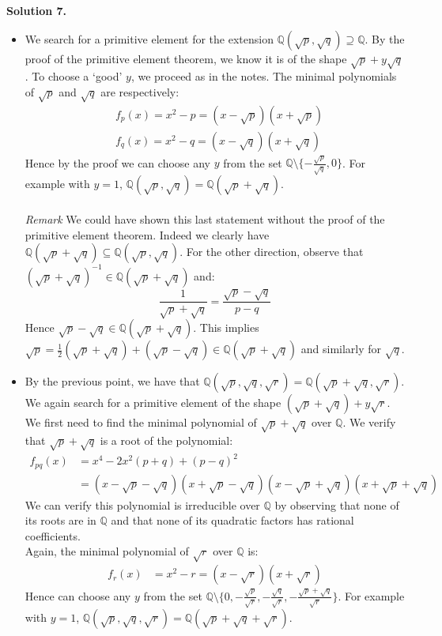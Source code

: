 \documentclass[12pt,a4paper]{article}
\begin{document}
\textbf{Solution 7.}

\begin{itemize}
\item We search for a primitive element for the extension $\mathbb{Q}(\sqrt{p},\sqrt{q})\supseteq \mathbb{Q}$. By the proof of the primitive element theorem, we know it is of the shape $\sqrt{p}+y\sqrt{q}$. To choose a `good' $y$, we proceed as in the notes. The minimal polynomials of $\sqrt{p}$ and $\sqrt{q}$ are respectively:
\begin{align*}
&f_p(x)=x^2-p=(x-\sqrt{p})(x+\sqrt{p})\\
&f_q(x)=x^2-q=(x-\sqrt{q})(x+\sqrt{q})
\end{align*}
Hence by the proof we can choose any $y$ from the set $\mathbb{Q} \setminus \{-\tfrac{\sqrt{p}}{\sqrt{q}}, 0\}$. 
For example with $y=1$, $\mathbb{Q}(\sqrt{p},\sqrt{q})=\mathbb{Q}(\sqrt{p}+\sqrt{q})$. \\
\\
\textit{Remark} We could have shown this last statement without the proof of the primitive element theorem. Indeed we clearly have 
$\mathbb{Q}(\sqrt{p}+\sqrt{q})\subseteq \mathbb{Q}(\sqrt{p},\sqrt{q})$. For the other direction, observe that $(\sqrt{p}+\sqrt{q})^{-1}\in \mathbb{Q}(\sqrt{p}+\sqrt{q})$ and:
$$\frac{1}{\sqrt{p}+\sqrt{q}}=\frac{\sqrt{p}-\sqrt{q}}{p-q}$$ Hence $\sqrt{p}-\sqrt{q}\in \mathbb{Q}(\sqrt{p}+\sqrt{q})$. This implies $\sqrt{p}=\tfrac{1}{2}(\sqrt{p}+\sqrt{q})+(\sqrt{p}-\sqrt{q}) \in \mathbb{Q}(\sqrt{p}+\sqrt{q})$ and similarly for $\sqrt{q}$. 

\item By the previous point, we have that $\mathbb{Q}(\sqrt{p},\sqrt{q},\sqrt{r})= \mathbb{Q}(\sqrt{p}+\sqrt{q}, \sqrt{r})$. We again search for a primitive element of the shape $(\sqrt{p}+\sqrt{q})+y\sqrt{r}$. We first need to find the minimal polynomial of $\sqrt{p}+\sqrt{q}$ over $\mathbb{Q}$. 
We verify that  $\sqrt{p}+\sqrt{q}$ is a root of the polynomial: 
\begin{align*}
f_{pq}(x)&=x^4-2x^2(p+q)+(p-q)^2\\
&=(x-\sqrt{p}-\sqrt{q})(x+\sqrt{p}-\sqrt{q})(x-\sqrt{p}+\sqrt{q})(x+\sqrt{p}+\sqrt{q})
\end{align*}
We can verify this polynomial is irreducible over $\mathbb{Q}$ by observing that none of its roots are in $\mathbb{Q}$ and that none of its quadratic factors has rational coefficients. \\
Again, the minimal polynomial of $\sqrt{r}$ over $\mathbb{Q}$ is: 
\begin{align*}
f_r(x)&=x^2-r=(x-\sqrt{r})(x+\sqrt{r})
\end{align*}
Hence can choose any $y$ from the set $\mathbb{Q} \setminus \{0, -\tfrac{\sqrt{p}}{\sqrt{r}}, -\tfrac{\sqrt{q}}{\sqrt{r}}, -\tfrac{\sqrt{p}+\sqrt{q}}{\sqrt{r}}\}$. 
For example with $y=1$, $\mathbb{Q}(\sqrt{p},\sqrt{q}, \sqrt{r})=\mathbb{Q}(\sqrt{p}+\sqrt{q}+\sqrt{r})$. \\
\end{itemize}
\end{document}
